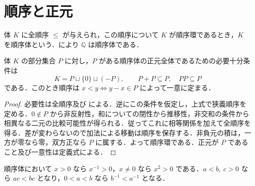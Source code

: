 \section{順序と正元}
\begin{defn}[順序体]
体 $K$ に全順序 $\leq$ が与えられ，この順序について $K$ が順序環であるとき，$K$ を順序体という．により $\mathbb Q$ は順序体である．
\end{defn}
\begin{prop}[正元集合による順序体の特徴づけ]
体 $K$ の部分集合 $P$ に対し，$P$ がある順序体の正元全体であるための必要十分条件は
\[
 K=P\sqcup\{0\}\sqcup(-P),\qquad P+P\subseteq P,\quad PP\subseteq P
\]
である．このとき順序は $x<y\Longleftrightarrow y-x\in P$ によって一意に定まる．
\end{prop}
\begin{proof}
必要性は全順序及び による．逆にこの条件を仮定し，上式で狭義順序を定める．$0\notin P$ から非反射性，和についての閉性から推移性，非交和の条件から相異なる二元の比較可能性が得られる．従ってこれに相等関係を加えて全順序を得る．差が変わらないので加法による移動は順序を保存する．非負元の積は，一方が零なら零，双方正なら $P$ に属する．よって順序環である．正元が $P$ であること及び一意性は定義式による．
\end{proof}
\begin{prop}[順序体における積と逆元の不等式]
順序体において $x>0$ なら $x^{-1}>0$，$x\ne0$ なら $x^2>0$ である．$a<b,\ c>0$ なら $ac<bc$ となり，$0<a<b$ なら $b^{-1}<a^{-1}$ となる．
\end{prop}
